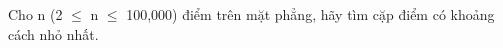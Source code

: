 Cho n (2  $\le$  n  $\le$  100,000) điểm trên mặt phẳng, hãy tìm cặp điểm có khoảng cách nhỏ nhất.  

\